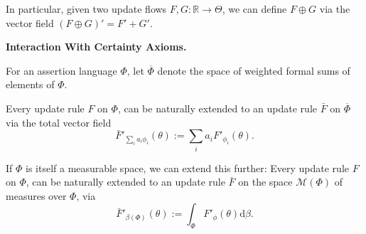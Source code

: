 \documentclass{article}
\newcommand{\ext}[1]{\overline #1} %
\begin{document}
In particular, given two update flows $F, G : \mathbb R \to \Theta$, we can define
$F \oplus G$ via the vector field $(F \oplus G)' = F' + G'$.

\begin{wip}
    \textbf{Interaction With Certainty Axioms.}

\end{wip}

\begin{defn}
    For an assertion language $\Phi$, let $\ext\Phi$ denote
    the space of weighted formal sums of elements of $\Phi$.
\end{defn}

\begin{prop}
    Every  update rule $F$ on $\Phi$, can be naturally extended to an update rule
    $\bar F$ on $\ext\Phi$
    via the total vector field
    \[
        \bar F'_{\textstyle\sum_i a_i \phi_i} ( \theta ) := \sum_{i} a_i F'_{\phi_i}(\theta).
    \]
%
\end{prop}

If $\Phi$ is itself a measurable space, we can extend this further:
Every  update rule $F$ on $\Phi$, can be naturally extended to an update rule $\bar F$ on the space $\mathcal M(\Phi)$ of measures over $\Phi$, via
\[
    \bar F'_{\beta(\Phi)}( \theta ) := \int_{\Phi} F'_\phi(\theta) \mathrm d\beta.
\]



%
%
\end{document}
